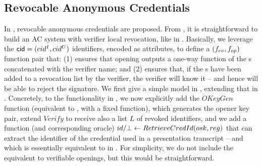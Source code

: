 \subsection{Revocable Anonymous Credentials}
\label{sapp:related-models-rac}

In \cite{cks10}, revocable anonymous credentials are proposed. From \CUASGen, it
is straightforward to build an AC system with verifier local revocation, like in
\cite{bs04}. Basically, we leverage the $\mathsf{cid}=(cid^I,cid^U)$ identifiers,
encoded as attributes, to define a $(f_{ev},f_{op})$ function pair that: (1)
ensures that opening outputs a one-way function of the {\cid}s concatenated with
the verifier name; and (2) ensures that, if the {\cid}s have been added to a
revocation list by the verifier, the verifier will know it -- and hence will be
able to reject the signature. We first give a simple model in
, extending that in .
Concretely, to the functionality in , we now
explicitly add
the $OKeyGen$ function (equivalent to \OKeyGen, with a fixed \finsp function),
which generates the opener key pair, extend $Verify$ to receive also a list $L$
of revoked identifiers, and we add a function (and corresponding oracle) $id/\bot
\gets RetrieveCredId(osk,reg)$ that can extract the identifier of the
credential used in a presentation transcript \utrans -- and which is essentially
equivalent to \Open in \UAS. For simplicity, we do not include the equivalent to
verifiable openings, but this would be straightforward.

